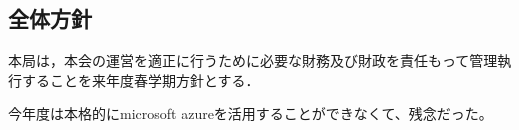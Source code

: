 \subsection*{全体方針}
本局は，本会の運営を適正に行うために必要な財務及び財政を責任もって管理執行することを来年度春学期方針とする．

今年度は本格的にmicrosoft azureを活用することができなくて、残念だった。